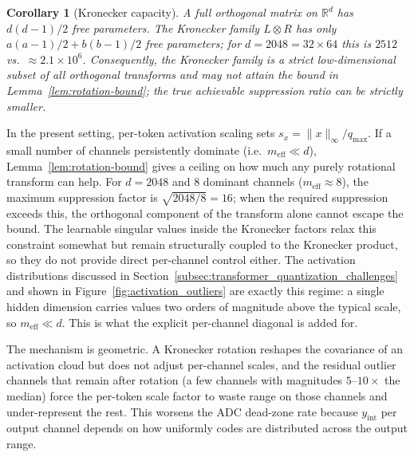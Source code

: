 \documentclass[a4paper,11pt,oneside]{article}
\theoremstyle{breakstyle}
\newtheorem{corollary}[lemma]{Corollary}
\begin{document}
  \begin{corollary}[Kronecker capacity]
    \label{cor:kronecker-capacity}
    A full orthogonal matrix on $\mathbb{R}^d$ has
    $d(d-1)/2$ free parameters.
    The Kronecker family $L \otimes R$ has only
    $a(a-1)/2 + b(b-1)/2$ free parameters; for $d = 2048 = 32 \times 64$
    this is $2512$ vs.\ $\approx 2.1 \times 10^6$.
    Consequently, the Kronecker family is a strict low-dimensional subset
    of all orthogonal transforms and may not attain the bound in
    Lemma~\ref{lem:rotation-bound}; the true achievable suppression ratio
    can be strictly smaller.
  \end{corollary}

  In the present setting, per-token activation scaling sets
  $s_x = \|x\|_\infty / q_{\max}$.  If a small number of channels
  persistently dominate (i.e.\ $m_{\mathrm{eff}} \ll d$),
  Lemma~\ref{lem:rotation-bound} gives a ceiling on how much any
  purely rotational transform can help.  For $d = 2048$ and 8
  dominant channels ($m_{\mathrm{eff}} \approx 8$), the maximum
  suppression factor is $\sqrt{2048/8} = 16$; when the required
  suppression exceeds this, the orthogonal component of the
  transform alone cannot escape the bound.  The learnable singular
  values inside the Kronecker factors relax this constraint
  somewhat but remain structurally coupled to the Kronecker
  product, so they do not provide direct per-channel control either.
  The activation distributions discussed in
  Section~\ref{subsec:transformer_quantization_challenges} and shown
  in Figure~\ref{fig:activation_outliers} are exactly this regime: a
  single hidden dimension carries values two orders of magnitude
  above the typical scale, so $m_{\mathrm{eff}} \ll d$.  This is
  what the explicit per-channel diagonal is added for.

  The mechanism is geometric. A Kronecker rotation reshapes the
  covariance of an activation cloud but does not adjust per-channel
  scales, and the residual outlier channels that remain after rotation
  (a few channels with magnitudes $5$--$10\times$ the median) force
  the per-token scale factor to waste range on those channels and
  under-represent the rest. This worsens the ADC dead-zone rate
  because $y_{\mathrm{int}}$ per output channel depends on how
  uniformly codes are distributed across the output range.
\end{document}

